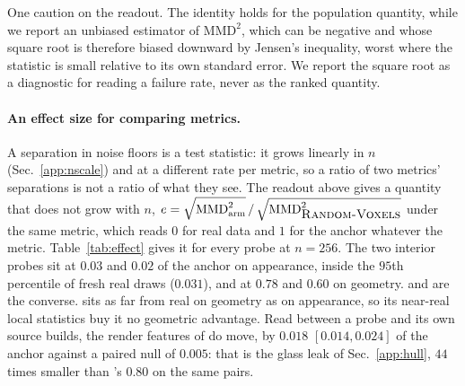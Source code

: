One caution on the readout. The identity holds for the population quantity, while we
report an unbiased estimator of $\mathrm{MMD}^2$, which can be negative and whose square
root is therefore biased downward by Jensen's inequality, worst where the statistic is
small relative to its own standard error. We report the square root as a diagnostic for
reading a failure rate, never as the ranked quantity.

\paragraph{An effect size for comparing metrics.} A separation in noise floors is a test
statistic: it grows linearly in $n$ (Sec.~\ref{app:nscale}) and at a different rate per
metric, so a ratio of two metrics' separations is not a ratio of what they see. The readout
above gives a quantity that does not grow with $n$,
$e = \sqrt{\mathrm{MMD}^2_{\text{arm}}}\,/\,\sqrt{\mathrm{MMD}^2_{\mbox{\textsc{Random-Voxels}}{}}}$ under the
same metric, which reads $0$ for real data and $1$ for the anchor whatever the metric.
Table~\ref{tab:effect} gives it for every probe at $n{=}256$. The two interior probes sit at
$0.03$ and $0.02$ of the anchor on appearance, inside the $95$th percentile of fresh real
draws ($0.031$), and at $0.78$ and $0.60$ on geometry. \matshuffle{} and \monochrome{} are
the converse. \patchstitch{} sits as far from real on geometry as on appearance, so its
near-real local statistics buy it no geometric advantage. Read between a probe and its own
source builds, the render features of \solidify{} do move, by $0.018$ $[0.014, 0.024]$ of the
anchor against a paired null of $0.005$: that is the glass leak of Sec.~\ref{app:hull}, $44$
times smaller than \vkid{}'s $0.80$ on the same pairs.

